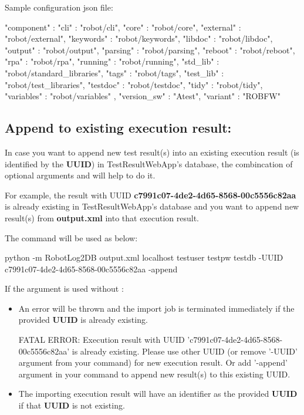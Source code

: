 \begin{itemize}
  Sample configuration json file:

\begin{pythoncode}
{
   "component"  : {
                  "cli"       : "robot/cli",
                  "core"      : "robot/core",
                  "external"  : "robot/external",
                  "keywords"  : "robot/keywords",
                  "libdoc"    : "robot/libdoc",
                  "output"    : "robot/output",
                  "parsing"   : "robot/parsing",
                  "reboot"    : "robot/reboot",
                  "rpa"       : "robot/rpa",
                  "running"   : "robot/running",
                  "std_lib"   : "robot/standard_libraries",
                  "tags"      : "robot/tags",
                  "test_lib"  : "robot/test_libraries",
                  "testdoc"   : "robot/testdoc",
                  "tidy"      : "robot/tidy",
                  "variables" : "robot/variables"
   },
   "version_sw" : "Atest",
   "variant"    : "ROBFW"
}
\end{pythoncode}
\end{itemize}

\subsection{Append to existing execution result:}
In case you want to append new test result(s) into an existing execution result 
(is identified by the \textbf{UUID}) in TestResultWebApp's database, 
the combincation of optional arguments  and  
will help to do it.

For example, the result with UUID \textbf{c7991c07-4de2-4d65-8568-00c5556c82aa} 
is already existing in TestResultWebApp's database and you want to append new 
result(s) from \textbf{output.xml} into that execution result.

The command will be used as below:
\begin{robotlog}
python -m RobotLog2DB output.xml localhost testuser testpw testdb -UUID c7991c07-4de2-4d65-8568-00c5556c82aa -append
\end{robotlog}

If the argument  is used without :
\begin{itemize}
  \item An error will be thrown and the import job is terminated immediately 
        if the provided \textbf{UUID} is already existing.
\begin{robotlog}
FATAL ERROR: Execution result with UUID 'c7991c07-4de2-4d65-8568-00c5556c82aa' is already existing.
             Please use other UUID (or remove '-UUID' argument from your command) for new execution result.
             Or add '-append' argument in your command to append new result(s) to this existing UUID.
\end{robotlog}
  \item The importing execution result will have an identifier as the provided 
        \textbf{UUID} if that \textbf{UUID} is not existing.
\end{itemize}

